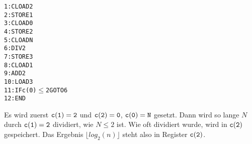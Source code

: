 \begin{alltt}
 1: CLOAD 2
 2: STORE 1
 3: CLOAD 0
 4: STORE 2
 5: CLOAD N
 6: DIV   2
 7: STORE 3
 8: CLOAD 1
 9: ADD 2
10: LOAD 3
11: IF c(0) \(\leq\) 2 GOTO 6
12: END 
\end{alltt}

Es wird zuerst $\tt{c(1)}=2$ und $\tt{c(2)}=0$, \(\tt{c(0)}=N\) gesetzt.
Dann wird so lange $N$ durch $\tt{c(1)}=2$ dividiert, wie $N \leq 2$ ist. Wie oft dividiert wurde, wird in $\tt{c(2)}$ gespeichert. Das Ergebnis $\lfloor log_2(n) \rfloor$ steht also in Register $\tt{c(2)}$.
